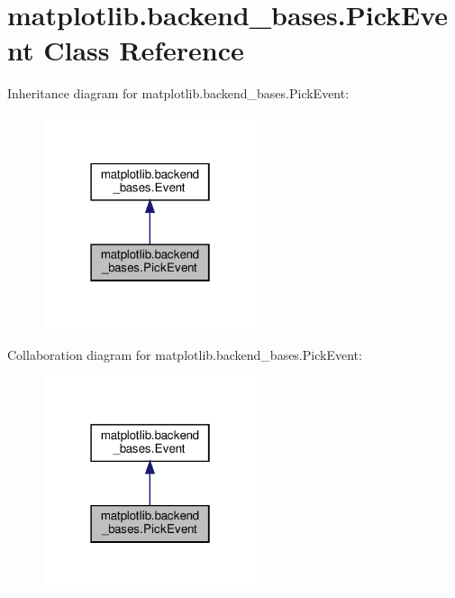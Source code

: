 \hypertarget{classmatplotlib_1_1backend__bases_1_1PickEvent}{}\section{matplotlib.\+backend\+\_\+bases.\+Pick\+Event Class Reference}
\label{classmatplotlib_1_1backend__bases_1_1PickEvent}


Inheritance diagram for matplotlib.\+backend\+\_\+bases.\+Pick\+Event\+:
\nopagebreak
\begin{figure}[H]
\begin{center}
\leavevmode
\includegraphics[width=178pt]{classmatplotlib_1_1backend__bases_1_1PickEvent__inherit__graph}
\end{center}
\end{figure}


Collaboration diagram for matplotlib.\+backend\+\_\+bases.\+Pick\+Event\+:
\nopagebreak
\begin{figure}[H]
\begin{center}
\leavevmode
\includegraphics[width=178pt]{classmatplotlib_1_1backend__bases_1_1PickEvent__coll__graph}
\end{center}
\end{figure}
